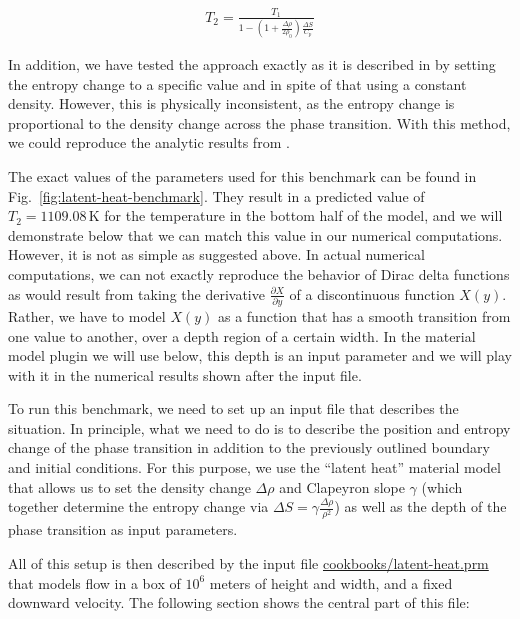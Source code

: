 \documentclass{article}
\begin{document}
\begin{gather*}
T_2 = \frac{T_1}{1 - (1+\frac{\Delta \rho}{2 \rho_0}) \frac{\Delta S}{C_p}}
\end{gather*}

In addition, we have tested the approach exactly as it is described in \cite{STO01} by setting the entropy change to a specific value and in spite of that using a constant density. However, this is physically inconsistent, as the entropy change is proportional to the density change across the phase transition. With this method, we could reproduce the analytic results from \cite{STO01}.

The exact values of the parameters used for this benchmark can be found in
Fig.~\ref{fig:latent-heat-benchmark}. They result in a predicted value of $T_2 =
1109.08 \, \text{K}$ for the temperature in the bottom half of the model, and
we will demonstrate below that we can match this value in our numerical
computations. However, it is not as simple as suggested above. In actual
numerical computations, we can not exactly reproduce the behavior of Dirac delta
functions as would result from taking the derivative $\frac{\partial
X}{\partial y}$ of a discontinuous function $X(y)$. Rather, we have to model
$X(y)$ as a function that has a smooth transition from one value to another,
over a depth region of a certain width. In the material model plugin we will use
below, this depth is an input parameter and we will play with it in the
numerical results shown after the input file.

To run this benchmark, we need to set up an input file that describes the
situation. In principle, what we need to do is to describe the position and
entropy change of the phase transition in addition to the previously outlined
boundary and initial conditions. For this purpose, we use the ``latent heat''
material model that allows us to set the density change $\Delta\rho$ and
Clapeyron slope $\gamma$ (which together determine the entropy change via
$\Delta S = \gamma \frac{\Delta\rho}{\rho^2}$) as well as the depth of the phase
transition as input parameters.

All of this setup is then described by the input file
\url{cookbooks/latent-heat.prm} that models flow in a box of $10^6$ meters of
height and width, and a fixed downward velocity. The following section shows the
central part of this file:


\end{document}
